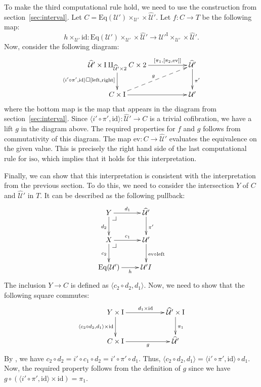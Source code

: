 \documentclass{amsart}
\makeatletter
\theoremstyle{definition}
\theoremstyle{remark}
\newcommand{\fs}[1]{\mathrm{#1}}
\newcommand{\lcon}{\fs{left}}
\newcommand{\rcon}{\fs{right}}
\newcommand{\I}{\fs{I}}
\newcommand{\iso}{\fs{iso}}
\newcommand{\id}{\fs{id}}
\newcommand{\U}{\mathcal{U}}
\newcommand{\hU}{\widehat{\mathcal{U}}}
\newcommand{\Eq}{\fs{Eq}}
\newcommand{\ev}{\fs{ev}}
\numberwithin{figure}{section}
\newcommand{\pb}[1][dr]{\save*!/#1-1.2pc/#1:(-1,1)@^{|-}\restore}
\makeatother
\begin{document}
To make the third computational rule hold, we need to use the construction from section~\ref{sec:interval}.
Let $C = \Eq(\U') \times_{\U'} \times \hU'$.
Let $f : C \to T$ be the following map:
\[ h \times_{\U'} \id : \Eq(\U') \times_{\U'} \times \hU' \to \U'^\I \times_{\U'} \times \hU'. \]
Now, consider the following diagram:
\[ \xymatrix{ \hU' \times \I \amalg_{\hU' \times 2} C \times 2 \ar[rr]^-{[\pi_1,[\pi_2,\ev]]} \ar[d]_{\langle i' \circ \pi', \id \rangle \square [\lcon,\rcon]} & & \hU' \ar[d]^{\pi'} \\
              C \times \I \ar[rr] \ar@{-->}[urr]^g                                                                                                              & & \U'
            } \]
where the bottom map is the map that appears in the diagram from section~\ref{sec:interval}.
Since $\langle i' \circ \pi', \id \rangle : \hU' \to C$ is a trivial cofibration, we have a lift $g$ in the diagram above.
The required properties for $f$ and $g$ follows from commutativity of this diagram.
The map $\ev : C \to \hU'$ evaluates the equivalence on the given value.
This is precisely the right hand side of the last computational rule for $\iso$, which implies that it holds for this interpretation.

Finally, we can show that this interpretation is consistent with the interpretation from the previous section.
To do this, we need to consider the intersection $Y$ of $C$ and $\hU'$ in $T$.
It can be described as the following pullback:
\[ \xymatrix{ Y \ar[r]^{d_1} \ar[d]_{d_2} \pb   & \hU' \ar[d]^{\pi'} \\
              X \ar[r]^{c_1} \ar[d]_{c_2} \pb   & \U' \ar[d]^{\ev \circ \lcon} \\
              \Eq(\U') \ar[r]_-h                & \U'^\I
            } \]
The inclusion $Y \to C$ is defined as $\langle c_2 \circ d_2, d_1 \rangle$.
Now, we need to show that the following square commutes:
\[ \xymatrix{ Y \times \I \ar[rr]^{d_1 \times \id} \ar[d]_-{\langle c_2 \circ d_2, d_1 \rangle \times \id}  & & \hU' \times \I \ar[d]^{\pi_1} \\
              C \times \I \ar[rr]_-g                                                                        & & \hU'
            } \]
By , we have $c_2 \circ d_2 = i' \circ c_1 \circ d_2 = i' \circ \pi' \circ d_1$.
Thus, $\langle c_2 \circ d_2, d_1 \rangle = \langle i' \circ \pi', \id \rangle \circ d_1$.
Now, the required property follows from the definition of $g$ since we have $g \circ (\langle i' \circ \pi', \id \rangle \times \id) = \pi_1$.



\end{document}
